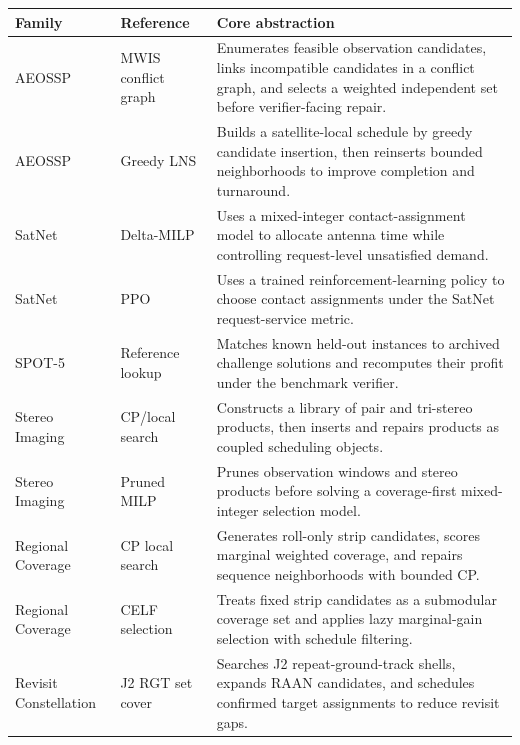 \documentclass[11pt]{article}
\begin{document}
\begin{table}[!t]
\centering
\scriptsize
\setlength{\tabcolsep}{3pt}
\renewcommand{\arraystretch}{1.12}
\begin{tabular}{>{\raggedright\arraybackslash}p{}>{\raggedright\arraybackslash}p{}>{\raggedright\arraybackslash}p{}}
\hline
\textbf{Family} & \textbf{Reference} & \textbf{Core abstraction} \\
\hline
AEOSSP & MWIS conflict graph \citep{eddy2021maximum} & Enumerates feasible observation candidates, links incompatible candidates in a conflict graph, and selects a weighted independent set before verifier-facing repair. \\
AEOSSP & Greedy LNS \citep{antuori2025solving} & Builds a satellite-local schedule by greedy candidate insertion, then reinserts bounded neighborhoods to improve completion and turnaround. \\
SatNet & Delta-MILP \citep{claudet2021delta} & Uses a mixed-integer contact-assignment model to allocate antenna time while controlling request-level unsatisfied demand. \\
SatNet & PPO \citep{goh2022satnet} & Uses a trained reinforcement-learning policy to choose contact assignments under the SatNet request-service metric. \\
SPOT-5 & Reference lookup \citep{lemaitrea2002selecting} & Matches known held-out instances to archived challenge solutions and recomputes their profit under the benchmark verifier. \\
Stereo Imaging & CP/local search \citep{lemaitrea2002selecting} & Constructs a library of pair and tri-stereo products, then inserts and repairs products as coupled scheduling objects. \\
Stereo Imaging & Pruned MILP \citep{kim2020task} & Prunes observation windows and stereo products before solving a coverage-first mixed-integer selection model. \\
Regional Coverage & CP local search \citep{antuori2025solving} & Generates roll-only strip candidates, scores marginal weighted coverage, and repairs sequence neighborhoods with bounded CP. \\
Regional Coverage & CELF selection \citep{leskovec2007cost,nemhauser1978analysis,khuller1999budgeted} & Treats fixed strip candidates as a submodular coverage set and applies lazy marginal-gain selection with schedule filtering. \\
Revisit Constellation & J2 RGT set cover \citep{lee2024satellite} & Searches J2 repeat-ground-track shells, expands RAAN candidates, and schedules confirmed target assignments to reduce revisit gaps. \\

\end{tabular}
\end{table}
\end{document}
